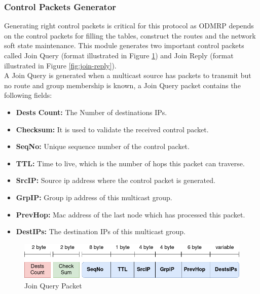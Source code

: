 \subsubsection{Control Packets Generator}
Generating right control packets is critical for this protocol as ODMRP depends on the control packets for filling the tables, construct the routes and the network soft state maintenance.
This module generates two important control packets called Join Query (format illustrated in Figure \ref{fig:join-query}) and Join Reply (format illustrated in Figure \ref{fig:join-reply}).
\\
A Join Query is generated when a multicast source has packets to transmit but no route and group membership is known, a Join Query packet contains the following fields: 
\begin{itemize}[itemsep=1pt, topsep=5pt]
    \item \textbf{Dests Count:} The Number of destinations IPs.
    \item \textbf{Checksum:} It is used to validate the received control packet.
    \item \textbf{SeqNo:} Unique sequence number of the control packet.
    \item \textbf{TTL:} Time to live, which is the number of hops this packet can traverse.
    \item \textbf{SrcIP:} Source \acrshort{ip} address where the control packet is generated.
    \item \textbf{GrpIP:} Group \acrshort{ip} address of this multicast group.
    \item \textbf{PrevHop:} Mac address of the last node which has processed this packet.
    \item \textbf{DestIPs:} The destination IPs of this multicast group.
\end{itemize} 

\begin{figure}[!htbp]
    \centering
    \includegraphics[width=\linewidth]{images/join-query.png}
    \caption{Join Query Packet}
    \label{fig:join-query}
\end{figure}

